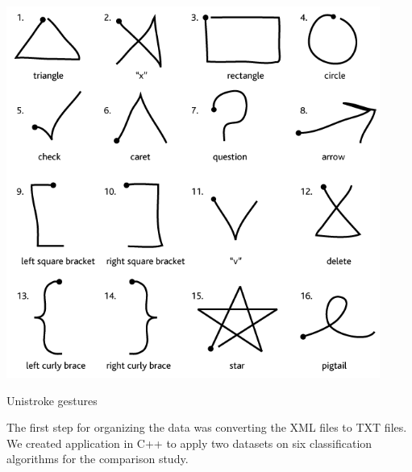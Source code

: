 \documentclass[twoside]{article}
\begin{document}
\begin{multicols}{2}
	
	\includegraphics[scale=0.5]{../Figures/unistrokes.png}
	\caption{Unistroke gestures}
	\label{fig:unistrokes}


The first step for organizing the data was converting the XML files to TXT files. We created application in C++ to apply two datasets on six classification algorithms for the comparison study.


\end{multicols}
\end{document}
